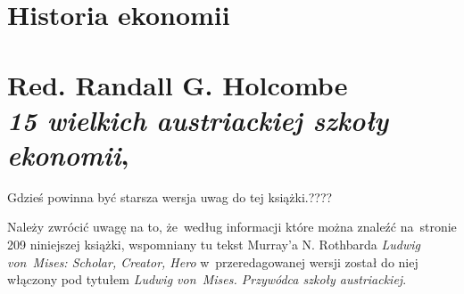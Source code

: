 \documentclass[a4paper,11pt]{article}
\numberwithin{equation}{section}
\begin{document}












\newpage

\section{Historia ekonomii}

\VerSpaceTwo




\section{ %
  Red. Randall G. Holcombe \\
  \textit{15 wielkich austriackiej szkoły ekonomii},
  \cite{}}

\vspace{0em}



\vspace{0em}


Gdzieś powinna być starsza wersja uwag do tej książki.????

\VerSpaceFour










\noindent
{} Należy zwrócić uwagę na to, że~według informacji
które można znaleźć na~stronie 209 niniejszej książki, wspomniany tu tekst
Murray’a N.
Rothbarda \textit{Ludwig von~Mises: Scholar, Creator, Hero}
w~przeredagowanej wersji został do niej włączony pod tytułem \textit{Ludwig
  von~Mises. Przywódca szkoły austriackiej}.








\newpage

\end{document}
